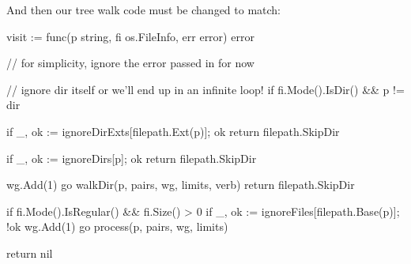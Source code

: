 \documentclass[12pt,notitlepage]{article}
\begin{document}
And then our tree walk code must be changed to match:
\begin{golang}
	visit := func(p string, fi os.FileInfo, err error) error {
        // for simplicity, ignore the error passed in for now

        // ignore dir itself or we'll end up in an infinite loop!
		if fi.Mode().IsDir() && p != dir {
			if _, ok := ignoreDirExts[filepath.Ext(p)]; ok {
				return filepath.SkipDir
			}

			if _, ok := ignoreDirs[p]; ok {
				return filepath.SkipDir
			}

			wg.Add(1)
			go walkDir(p, pairs, wg, limits, verb)
			return filepath.SkipDir
		}

		if fi.Mode().IsRegular() && fi.Size() > 0 {
			if _, ok := ignoreFiles[filepath.Base(p)]; !ok {
				wg.Add(1)
				go process(p, pairs, wg, limits)
			}
		}

		return nil
	}
\end{golang}
\end{document}

